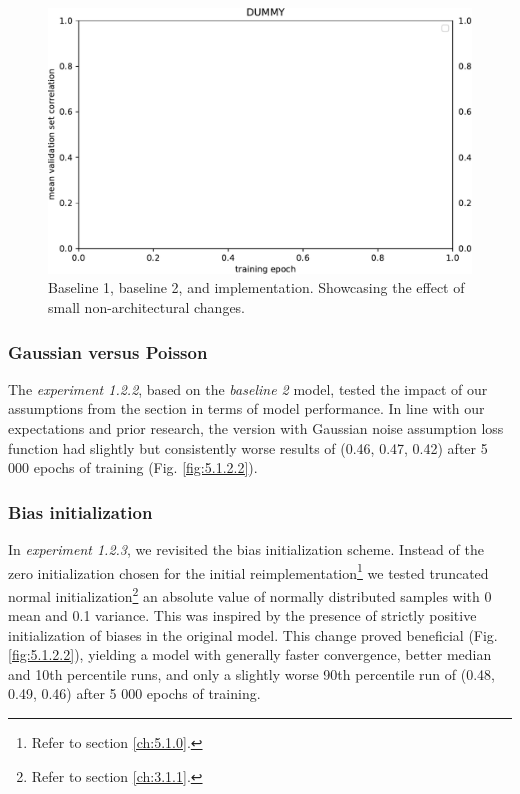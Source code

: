 \begin{figure}[H]
    \centering
    \includegraphics[width=1\textwidth]{../figures/05_dummy}
    \caption[Experiment 5.1.2.1 2]{Baseline 1, baseline 2, and \citeauthor{antolik} implementation. Showcasing the effect of small non-architectural changes.}
    \label{fig:5.1.2.1_2}
\end{figure}

\subsubsection{Gaussian versus Poisson}\label{ex:1.2.2}
The \emph{experiment 1.2.2}, based on the \emph{baseline 2} model, tested the impact of our assumptions from the  section in terms of model performance. In line with our expectations and prior research, the version with Gaussian noise assumption loss function had slightly but consistently worse results of (0.46, 0.47, 0.42) after 5 000 epochs of training (Fig. \ref{fig:5.1.2.2}). 

\subsubsection{Bias initialization}\label{ex:1.2.3}

In \emph{experiment 1.2.3}, we revisited the bias initialization scheme. Instead of the zero initialization chosen for the initial reimplementation\footnote{Refer to section \ref{ch:5.1.0}.} we tested truncated normal initialization\footnote{Refer to section \ref{ch:3.1.1}.} an absolute value of normally distributed samples with 0 mean and 0.1 variance. This was inspired by the presence of strictly positive initialization of biases in the original model. This change proved beneficial (Fig. \ref{fig:5.1.2.2}), yielding a model with generally faster convergence, better median and 10th percentile runs, and only a slightly worse 90th percentile run of (0.48, 0.49, 0.46) after 5 000 epochs of training.

